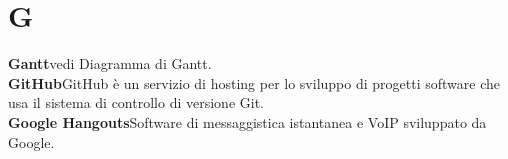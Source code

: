 \newpage
\section{G}\label{l:G}
\textbf{Gantt}\newline vedi Diagramma di Gantt.\\
\newline
\textbf{GitHub}\newline GitHub è un servizio di hosting per lo sviluppo di progetti software che usa il sistema di controllo di versione Git.\\
\newline
\textbf{Google Hangouts}\newline Software di messaggistica istantanea e VoIP sviluppato da Google.